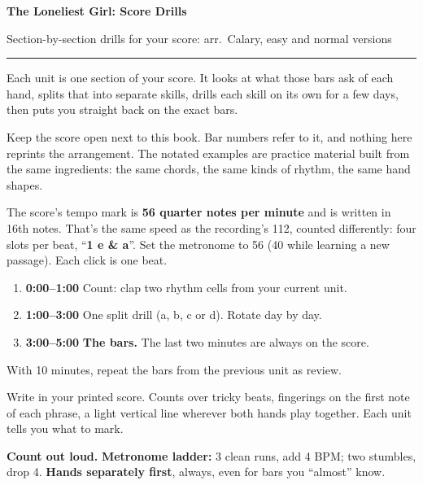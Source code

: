\documentclass[10pt]{article}
\newcommand{\sect}[1]{\par\vspace{5pt}{\large\bfseries #1}\par\vspace{2pt}}
\begin{document}
{\fontsize{26}{28}\selectfont\bfseries The Loneliest Girl: Score Drills}\par\vspace{2pt}
{\large Section-by-section drills for your score: arr.\ Calary, easy and normal versions}\par
\vspace{2pt}\noindent\rule{\textwidth}{0.8pt}\par\vspace{2pt}

\begin{minipage}[t]{0.485\textwidth}
\sect{How this works}
Each unit is one section of your score. It looks at what those bars ask of each hand, splits that into separate skills, drills each skill on its own for a few days, then puts you straight back on the exact bars.

Keep the score open next to this book. Bar numbers refer to it, and nothing here reprints the arrangement. The notated examples are practice material built from the same ingredients: the same chords, the same kinds of rhythm, the same hand shapes.

\sect{Reading the tempo}
The score's tempo mark is \textbf{56 quarter notes per minute} and is written in 16th notes. That's the same speed as the recording's 112, counted differently: four slots per beat, ``\textbf{1 e \& a}''. Set the metronome to 56 (40 while learning a new passage). Each click is one beat.

\sect{The daily routine (5 minutes)}
\begin{enumerate}
\item \textbf{0:00--1:00} Count: clap two rhythm cells from your current unit.
\item \textbf{1:00--3:00} One split drill (a, b, c or d). Rotate day by day.
\item \textbf{3:00--5:00} \textbf{The bars.} The last two minutes are always on the score.
\end{enumerate}
With 10 minutes, repeat the bars from the previous unit as review.

\sect{Pencil on the score}
Write in your printed score. Counts over tricky beats, fingerings on the first note of each phrase, a light vertical line wherever both hands play together. Each unit tells you what to mark.

\sect{Rules}
\textbf{Count out loud.} \textbf{Metronome ladder:} 3 clean runs, add 4 BPM; two stumbles, drop 4. \textbf{Hands separately first}, always, even for bars you ``almost'' know.
\end{minipage}\hfill
\end{document}
